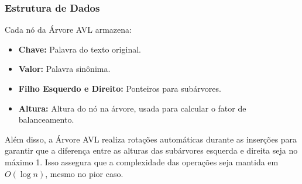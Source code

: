 \documentclass[a4paper, 12pt, english]{article}
\begin{document}
\subsubsection{Estrutura de Dados}
Cada nó da Árvore AVL armazena:
\begin{itemize}
\item \textbf{Chave:} Palavra do texto original.
\item \textbf{Valor:} Palavra sinônima.
\item \textbf{Filho Esquerdo e Direito:} Ponteiros para subárvores.
\item \textbf{Altura:} Altura do nó na árvore, usada para calcular o fator de balanceamento.
\end{itemize}
Além disso, a Árvore AVL realiza rotações automáticas durante as inserções para garantir que a diferença entre as alturas das subárvores esquerda e direita seja no máximo 1. Isso assegura que a complexidade das operações seja mantida em $O(\log n)$, mesmo no pior caso.
\end{document}

